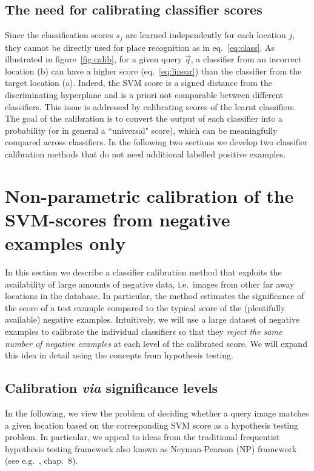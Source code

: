   \subsection{The need for calibrating classifier scores}
    Since the classification scores $s_j$ are learned independently for each location $j$, they cannot be directly used for place recognition as in eq.~\eqref{eq:class}. As illustrated in figure~\ref{fig:calib}, for a given query $\vec{q}$, a classifier from an incorrect location (b) can have a higher score {(eq.~\eqref{eq:linear})} than the classifier from the target location (a). Indeed, the SVM score is a signed distance from the discriminating hyperplane and is a priori not comparable between different classifiers. This issue is addressed by calibrating scores of the learnt classifiers. The goal of the calibration is to convert the output of each classifier into a probability (or in general a ``universal" score), which can be meaningfully compared across classifiers. In the following two sections we develop two classifier calibration methods that do not need additional labelled positive examples.
 
\section{Non-parametric calibration of the  SVM-scores from negative examples only}
\label{sec:calibration}
  In this section we describe a classifier calibration method that exploits the availability of large amounts of negative data, i.e.\ images from other far away locations in the database.
  In particular, the method estimates the significance of the score of a test example compared to the typical score of  the (plentifully available) negative examples. Intuitively, we will use a large dataset of negative examples to calibrate the individual classifiers so that they {\em reject the same number of negative examples} at each level of the calibrated score.   We will expand this idea in detail using the concepts from hypothesis testing.


   \subsection{Calibration \emph{via} significance levels}
      In the following, we view  the problem of deciding whether a query image matches a given location based on the corresponding SVM score as a hypothesis testing problem. In particular, we appeal to ideas from the traditional frequentist hypothesis testing framework also known as Neyman-Pearson (NP) framework (see e.g.~\cite{casella2001statistical}, chap.~8).

